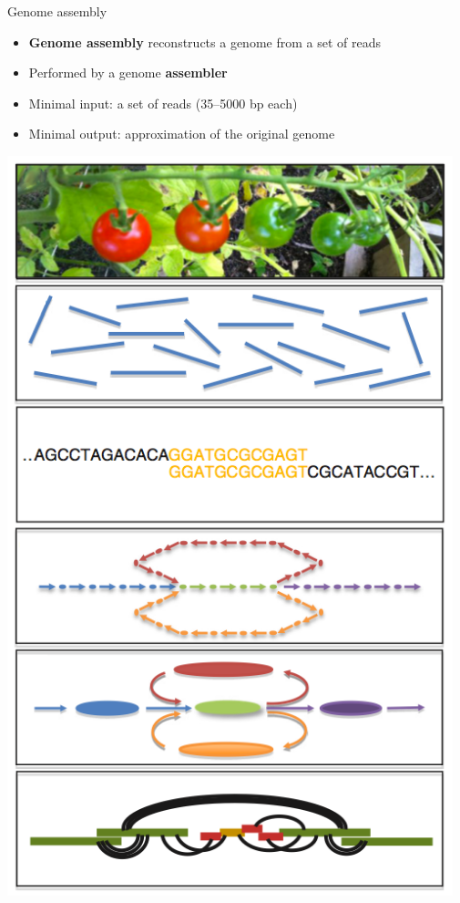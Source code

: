 \documentclass[xcolor=dvipsnames]{beamer}
\begin{document}
\begin{frame}{Genome assembly}
    \begin{minipage}{0.63\textwidth}
        \begin{itemize}
            \item {\bf Genome assembly} reconstructs
                  a genome from a set of reads
            \item Performed by a genome {\bf assembler}
            \item Minimal input: a set of reads (35--5000 bp each)
            \item Minimal output: approximation of the original genome
        \end{itemize}
    \end{minipage}
    \begin{minipage}{0.35\textwidth}
        \includegraphics[width=0.97\textwidth]{AssemblyFlow.jpg}
    \end{minipage}
\end{frame}
\end{document}
